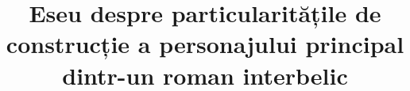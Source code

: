 

\title{Eseu despre particularitățile de construcție a personajului principal dintr-un roman interbelic}


 \maketitle %
 

